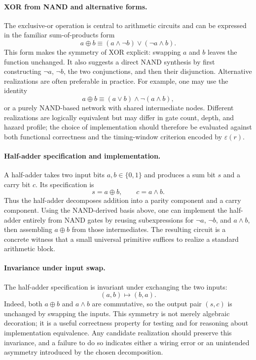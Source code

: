 \documentclass[11pt]{article}
\begin{document}
\paragraph{XOR from NAND and alternative forms.}
The exclusive-or operation is central to arithmetic circuits and can be expressed in the familiar sum-of-products form
\[
 a \oplus b \equiv (a \wedge \neg b) \vee (\neg a \wedge b).
\]
This form makes the symmetry of XOR explicit: swapping \(a\) and \(b\) leaves the function unchanged. It also suggests a direct NAND synthesis by first constructing \(\neg a\), \(\neg b\), the two conjunctions, and then their disjunction. Alternative realizations are often preferable in practice. For example, one may use the identity
\[
 a \oplus b \equiv (a \vee b) \wedge \neg(a \wedge b),
\]
or a purely NAND-based network with shared intermediate nodes. Different realizations are logically equivalent but may differ in gate count, depth, and hazard profile; the choice of implementation should therefore be evaluated against both functional correctness and the timing-window criterion encoded by \(\varepsilon(r)\).

\paragraph{Half-adder specification and implementation.}
A half-adder takes two input bits \(a,b \in \{0,1\}\) and produces a sum bit \(s\) and a carry bit \(c\). Its specification is
\[
 s = a \oplus b, \qquad c = a \wedge b.
\]
Thus the half-adder decomposes addition into a parity component and a carry component. Using the NAND-derived basis above, one can implement the half-adder entirely from NAND gates by reusing subexpressions for \(\neg a\), \(\neg b\), and \(a \wedge b\), then assembling \(a \oplus b\) from those intermediates. The resulting circuit is a concrete witness that a small universal primitive suffices to realize a standard arithmetic block.

\paragraph{Invariance under input swap.}
The half-adder specification is invariant under exchanging the two inputs:
\[
(a,b) \mapsto (b,a).
\]
Indeed, both \(a \oplus b\) and \(a \wedge b\) are commutative, so the output pair \((s,c)\) is unchanged by swapping the inputs. This symmetry is not merely algebraic decoration; it is a useful correctness property for testing and for reasoning about implementation equivalence. Any candidate realization should preserve this invariance, and a failure to do so indicates either a wiring error or an unintended asymmetry introduced by the chosen decomposition.
\end{document}
